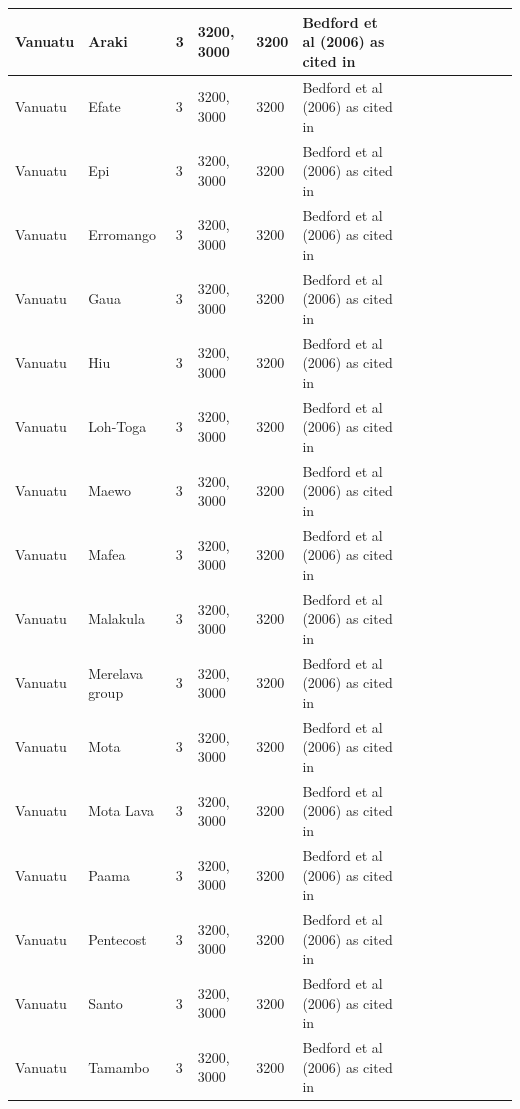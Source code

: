 \documentclass[a4paper,10pt]{article} %
\begin{document}
\begin{landscape}
\begin{longtable}{| p{3cm}| p{4cm}| p{4cm}|p{2cm}|p{2cm}|p{2cm}|p{2cm}|p{2cm}|p{2cm}|p{2cm}|p{2cm}|p{2cm}|p{2cm}|p{2cm}}
 Vanuatu & Araki & 3 & 3200, 3000 & 3200 & Bedford et al (2006) as cited in \citet{rieth_cochrane_2018} &   \\ \hline
 Vanuatu & Efate & 3 & 3200, 3000 & 3200 & Bedford et al (2006) as cited in \citet{rieth_cochrane_2018} &   \\ \hline
 Vanuatu & Epi & 3 & 3200, 3000 & 3200 & Bedford et al (2006) as cited in \citet{rieth_cochrane_2018} &   \\ \hline
 Vanuatu & Erromango & 3 & 3200, 3000 & 3200 & Bedford et al (2006) as cited in \citet{rieth_cochrane_2018} &   \\ \hline
 Vanuatu & Gaua & 3 & 3200, 3000 & 3200 & Bedford et al (2006) as cited in \citet{rieth_cochrane_2018} &   \\ \hline
 Vanuatu & Hiu & 3 & 3200, 3000 & 3200 & Bedford et al (2006) as cited in \citet{rieth_cochrane_2018} &   \\ \hline
 Vanuatu & Loh-Toga & 3 & 3200, 3000 & 3200 & Bedford et al (2006) as cited in \citet{rieth_cochrane_2018} &   \\ \hline
 Vanuatu & Maewo & 3 & 3200, 3000 & 3200 & Bedford et al (2006) as cited in \citet{rieth_cochrane_2018} &   \\ \hline
 Vanuatu & Mafea & 3 & 3200, 3000 & 3200 & Bedford et al (2006) as cited in \citet{rieth_cochrane_2018} &   \\ \hline
 Vanuatu & Malakula & 3 & 3200, 3000 & 3200 & Bedford et al (2006) as cited in \citet{rieth_cochrane_2018} &   \\ \hline
 Vanuatu & Merelava group & 3 & 3200, 3000 & 3200 & Bedford et al (2006) as cited in \citet{rieth_cochrane_2018} &   \\ \hline
 Vanuatu & Mota & 3 & 3200, 3000 & 3200 & Bedford et al (2006) as cited in \citet{rieth_cochrane_2018} &   \\ \hline
 Vanuatu & Mota Lava & 3 & 3200, 3000 & 3200 & Bedford et al (2006) as cited in \citet{rieth_cochrane_2018} &   \\ \hline
 Vanuatu & Paama & 3 & 3200, 3000 & 3200 & Bedford et al (2006) as cited in \citet{rieth_cochrane_2018} &   \\ \hline
 Vanuatu & Pentecost & 3 & 3200, 3000 & 3200 & Bedford et al (2006) as cited in \citet{rieth_cochrane_2018} &   \\ \hline
 Vanuatu & Santo & 3 & 3200, 3000 & 3200 & Bedford et al (2006) as cited in \citet{rieth_cochrane_2018} &   \\ \hline
 Vanuatu & Tamambo & 3 & 3200, 3000 & 3200 & Bedford et al (2006) as cited in \citet{rieth_cochrane_2018} &   \\ \hline

\end{longtable}
\end{landscape}
\end{document}
